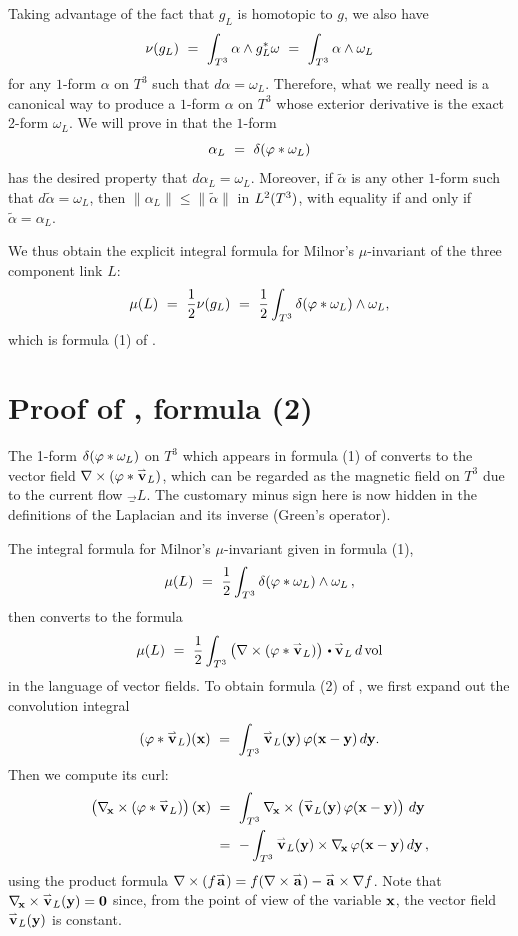 Taking advantage of the fact that $g_L$ is homotopic to $g$, we also have
$$
\nu(g_L) \ = \  \int_{T^3}\alpha\wedge g_L^*\omega \ = \ \int_{T^3}\alpha\wedge \omega_L
$$
for any $1$-form $\alpha$ on $T^3$ such that $d\alpha=\omega_L$.  Therefore,
what we really need is a canonical way to produce a $1$-form $\alpha$ on $T^3$ whose exterior derivative is the exact 2-form $\omega_L$.   We will prove in  that the $1$-form 
$$
\alpha_L \ = \ \delta(\varphi * \omega_L)
$$
has the desired property that $d\alpha_L=\omega_L$.  Moreover, if $\widetilde\alpha$ is any other $1$-form such that $d\widetilde\alpha=\omega_L$, then $\|\alpha_L\| \le \|\widetilde\alpha\|$ in $L^2(T^3)$, with equality if and only if $\widetilde\alpha=\alpha_L$. 

We thus obtain the explicit integral formula for Milnor's $\mu$-invariant of the three component link $L$:
$$
\mu(L) \ = \ {1\over 2}\nu(g_L) \ = \ {1\over 2}\int_{T^3}\delta(\ph * \omega_L)\wedge\omega_L,
$$
which is formula (1) of .


\part{Proof of  , formula (2)}

The 1-form $\delta(\varphi * \omega_L)$ on $T^3$ which appears in formula (1) of 
converts to the vector field $\nabla\times(\varphi * \overset{\scriptstyle{}_\rightharpoonup}{\textup{\bf v}}_L)$, which can be regarded as the magnetic field 
on $T^3$ due to the current flow $\vec_L$. The customary minus sign here is now hidden in the 
definitions of the Laplacian and its inverse (Green's operator).

The integral formula for Milnor's $\mu$-invariant given in formula (1),
$$
\mu(L) \ = \ {1\over 2}\int_{T^3}\delta(\varphi * \omega_L)\wedge\omega_L\,,
$$
then converts to the formula
$$
\mu(L) \ = \ {1\over 2}\int_{T^3}\left(\vphantom{x^2}\nabla\times(\ph * \vec_L)\right)\dt\vec_L\,d\vol
$$
in the language of vector fields. To obtain formula (2) of , we first expand out the convolution integral
$$
(\ph * \vec_L)(\x) \ = \ \int_{T^3}\vec_L(\y)\,\ph(\x-\y)\,d\y.
$$
Then we compute its curl:
$$
\begin{aligned}
\left(\vphantom{x^2}\nabla_{\!\textup{\bf x}}\times(\varphi * \overset{\scriptstyle{}_\rightharpoonup}{\textup{\bf v}}_L)\right)(\textup{\bf x})
\ &= \  \int_{T^3}\nabla_{\!\textup{\bf x}}\times\left(\vphantom{x^2}\overset{\scriptstyle{}_\rightharpoonup}{\textup{\bf v}}_L(\textup{\bf y})\,\varphi(\textup{\bf x}-\textup{\bf y})\right)\,d\textup{\bf y}  \\
\ &= \  -\int_{T^3}\overset{\scriptstyle{}_\rightharpoonup}{\textup{\bf v}}_L(\textup{\bf y})\times\nabla_{\!\textup{\bf x}}\,\varphi(\textup{\bf x}-\textup{\bf y})\,d\textup{\bf y}\,,
\end{aligned}
$$
using the product formula $\nabla\times(f\overset{\scriptstyle{}_\rightharpoonup}{\textup{\bf a}})=f(\nabla\times \overset{\scriptstyle{}_\rightharpoonup}{\textup{\bf a}})-\overset{\scriptstyle{}_\rightharpoonup}{\textup{\bf a}}\times\nabla f$.
Note that $\nabla_{\!\textup{\bf x}}\times\overset{\scriptstyle{}_\rightharpoonup}{\textup{\bf v}}_L(\textup{\bf y})={\bf0}$ since, from the point of view of the variable
$\textup{\bf x}$, the vector field $\overset{\scriptstyle{}_\rightharpoonup}{\textup{\bf v}}_L(\textup{\bf y})$ is constant.

